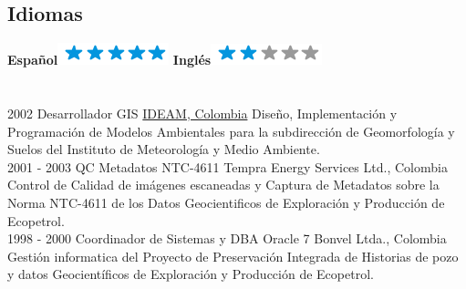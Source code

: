 \documentclass[]{friggeri-cv}
\begin{document}
\begin{aside}
  \section{Idiomas}
    \textbf{Español}\includegraphics[scale=0.40]{img/5stars.png}
    \textbf{Inglés}\includegraphics[scale=0.40]{img/2stars.png}
\end{aside}

\section{\phantom{Experiencia Profesional (Continuación)}}
\begin{entrylist}
    \entry
        {2002}
        {Desarrollador GIS}
        {\href{http://www.ideam.gov.co/}{IDEAM, Colombia}}
        {Diseño, Implementación y Programación de Modelos Ambientales para la subdirección de Geomorfología y Suelos del Instituto de Meteorología y Medio Ambiente.\\}
    \entry
        {2001 - 2003}
        {QC Metadatos NTC-4611}
        {Tempra Energy Services Ltd., Colombia}
        {Control de Calidad de imágenes escaneadas y Captura de Metadatos sobre la Norma NTC-4611 de los Datos Geocientificos de Exploración y Producción de Ecopetrol.\\}
    \entry
        {1998 - 2000}
        {Coordinador de Sistemas y DBA Oracle 7}
        {Bonvel Ltda., Colombia}
        {Gestión informatica del Proyecto de Preservación Integrada de Historias de pozo y datos Geocientíficos de Exploración y Producción de Ecopetrol.\\}
\end{entrylist}
\end{document}
